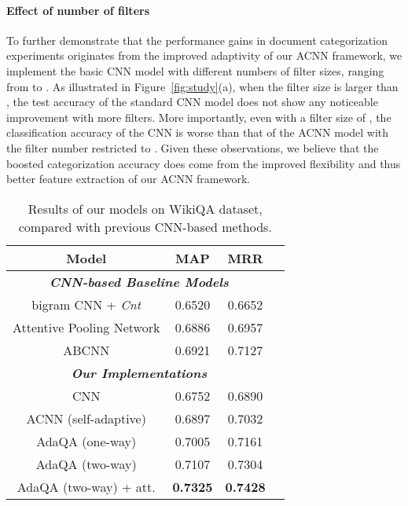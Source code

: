 \documentclass[11pt,a4paper]{article}
\begin{document}
\paragraph{Effect of number of filters} To further demonstrate that the performance gains in document categorization experiments originates from the improved adaptivity of our ACNN framework, we implement the basic CNN model with different numbers of filter sizes, ranging from  to . As illustrated in Figure~\ref{fig:study}(a), when the filter size is larger than , the test accuracy of the standard CNN model does not show any noticeable improvement with more filters. More importantly, even with a filter size of , the classification accuracy of the CNN is worse than that of the ACNN model with the filter number restricted to . Given these observations, we believe that the boosted categorization accuracy does come from the improved flexibility and thus better feature extraction of our ACNN framework.
\begin{table}
	\centering
	\begin{tabular}{c|c|cc}
		\toprule[1.2pt]
		\textbf{Model} &  \textbf{MAP} &  \textbf{MRR}   \\
		\hline
		\multicolumn{3}{c}{\emph{\textbf{CNN-based Baseline Models}}} \\
		\hline
		bigram CNN + \emph{Cnt}      & 0.6520 & 0.6652 \\
		Attentive Pooling Network     & 0.6886 & 0.6957 \\
		ABCNN     & 0.6921 & 0.7127 \\
		\hline
		\multicolumn{3}{c}{\emph{\textbf{Our Implementations}}} \\
		\hline
		CNN        & 0.6752 & 0.6890 \\
		ACNN (self-adaptive)         & 0.6897 & 0.7032  \\
		AdaQA (one-way)         & 0.7005 & 0.7161  \\ 
		AdaQA (two-way)       & 0.7107 & 0.7304  \\ 
		AdaQA (two-way) + att. & \textbf{0.7325} & \textbf{0.7428}  \\ 
		\bottomrule[1.2pt]
	\end{tabular}
	\caption{\small Results of our models on WikiQA dataset, compared with previous CNN-based methods.}
	\label{tab:wikiqa}
	\vspace{-5mm}
\end{table}
\vspace{-1mm}
\end{document}
